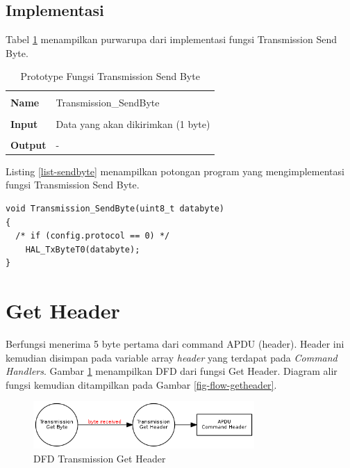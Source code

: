\subsection {Implementasi}

Tabel \ref{tabel-sendbyte} menampilkan purwarupa dari implementasi fungsi Transmission Send Byte. 

\begin{table}[!h]
  \centering
  \begin{tabular}{p{2cm} p{8cm}}
    \hline\\
    {\bf Name} & Transmission\_SendByte\\
    \hline\\
    {\bf Input} & Data yang akan dikirimkan (1 byte)
    \\
    \hline\\
    {\bf Output} & -
    \\
    \hline
  \end{tabular}
  \caption{Prototype Fungsi Transmission Send Byte}
  \label{tabel-sendbyte}
\end{table}

Listing \ref{list-sendbyte} menampilkan potongan program yang mengimplementasi fungsi Transmission Send Byte.

\begin{lstlisting}[caption={Listing Program Fungsi Transmisison Send Byte}, label={list-sendbyte}]
void Transmission_SendByte(uint8_t databyte)
{
  /* if (config.protocol == 0) */
    HAL_TxByteT0(databyte);
}
\end{lstlisting}


\section{Get Header}
\label{sec_getheader}

Berfungsi menerima 5 byte pertama dari command APDU (header). Header ini kemudian disimpan pada variable array \emph{header} yang terdapat pada \emph{Command Handlers}. Gambar \ref{fig-dfd-getheader} menampilkan DFD dari fungsi Get Header. Diagram alir fungsi kemudian ditampilkan pada Gambar \ref{fig-flow-getheader}.

\begin{figure}[!h]
\centering
\includegraphics[width=0.75\textwidth]{image/transmission/dfd_getheader.png}
\caption{DFD Transmission Get Header}
\label{fig-dfd-getheader}
\end{figure}


